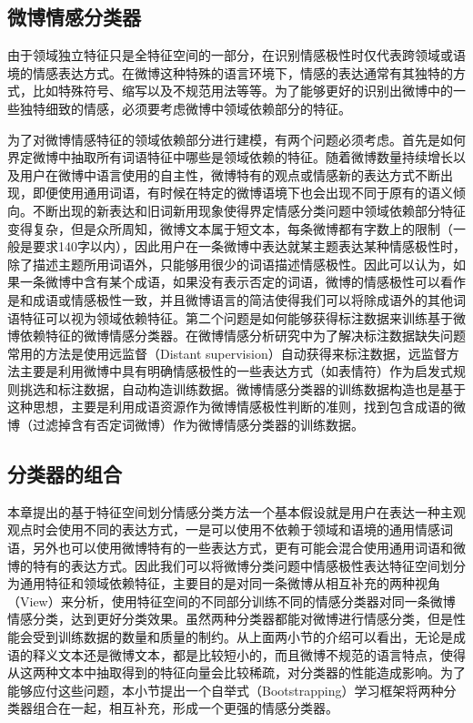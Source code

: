 \subsection{微博情感分类器}
\label{context}
由于领域独立特征只是全特征空间的一部分，在识别情感极性时仅代表跨领域或语境的情感表达方式。在微博这种特殊的语言环境下，情感的表达通常有其独特的方式，比如特殊符号、缩写以及不规范用法等等。为了能够更好的识别出微博中的一些独特细致的情感，必须要考虑微博中领域依赖部分的特征。

为了对微博情感特征的领域依赖部分进行建模，有两个问题必须考虑。首先是如何界定微博中抽取所有词语特征中哪些是领域依赖的特征。随着微博数量持续增长以及用户在微博中语言使用的自主性，微博特有的观点或情感新的表达方式不断出现，即便使用通用词语，有时候在特定的微博语境下也会出现不同于原有的语义倾向。不断出现的新表达和旧词新用现象使得界定情感分类问题中领域依赖部分特征变得复杂，但是众所周知，微博文本属于短文本，每条微博都有字数上的限制（一般是要求140字以内），因此用户在一条微博中表达就某主题表达某种情感极性时，除了描述主题所用词语外，只能够用很少的词语描述情感极性。因此可以认为，如果一条微博中含有某个成语，如果没有表示否定的词语，微博的情感极性可以看作是和成语或情感极性一致，并且微博语言的简洁使得我们可以将除成语外的其他词语特征可以视为领域依赖特征。第二个问题是如何能够获得标注数据来训练基于微博依赖特征的微博情感分类器。在微博情感分析研究中为了解决标注数据缺失问题常用的方法是使用远监督（Distant supervision）自动获得来标注数据，远监督方法主要是利用微博中具有明确情感极性的一些表达方式（如表情符）作为启发式规则挑选和标注数据，自动构造训练数据。微博情感分类器的训练数据构造也是基于这种思想，主要是利用成语资源作为微博情感极性判断的准则，找到包含成语的微博（过滤掉含有否定词微博）作为微博情感分类器的训练数据。

\subsection{分类器的组合}
\label{combination}
本章提出的基于特征空间划分情感分类方法一个基本假设就是用户在表达一种主观观点时会使用不同的表达方式，一是可以使用不依赖于领域和语境的通用情感词语，另外也可以使用微博特有的一些表达方式，更有可能会混合使用通用词语和微博的特有的表达方式。因此我们可以将微博分类问题中情感极性表达特征空间划分为通用特征和领域依赖特征，主要目的是对同一条微博从相互补充的两种视角（View）来分析，使用特征空间的不同部分训练不同的情感分类器对同一条微博情感分类，达到更好分类效果。虽然两种分类器都能对微博进行情感分类，但是性能会受到训练数据的数量和质量的制约。从上面两小节的介绍可以看出，无论是成语的释义文本还是微博文本，都是比较短小的，而且微博不规范的语言特点，使得从这两种文本中抽取得到的特征向量会比较稀疏，对分类器的性能造成影响。为了能够应付这些问题，本小节提出一个自举式（Bootstrapping）学习框架将两种分类器组合在一起，相互补充，形成一个更强的情感分类器。

